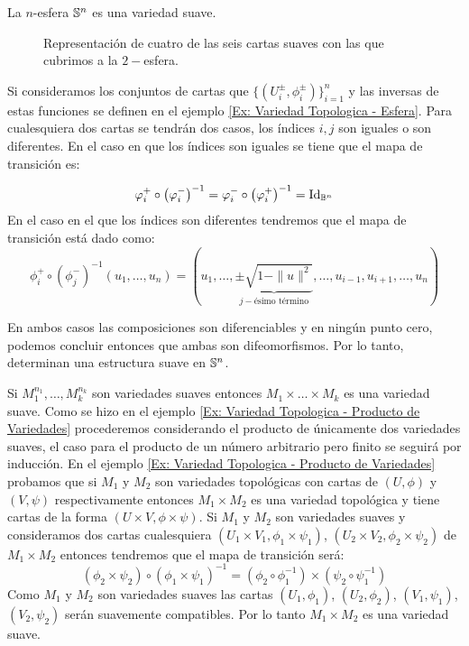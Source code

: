 \begin{example}[$n-$Esfera]
	La $n$-esfera $\S^n$ es una variedad suave.

	\begin{figure}[h]
		\begin{center}
			
			\caption{Representación de cuatro de las seis cartas suaves con las que cubrimos a la $2-$esfera.}
		\end{center}
	\end{figure}

	Si consideramos los conjuntos de cartas que $\{(U_i^{\pm}, \phi_{i}^{\pm})\}_{i=1}^{n}$ y las inversas de estas funciones se definen en el ejemplo \ref{Ex: Variedad Topologica - Esfera}. Para cualesquiera dos cartas se tendrán dos casos, los índices $i,j$ son iguales o son diferentes. En el caso en que los índices son iguales se tiene que el mapa de transición es:

	\[ \phi_i^{+} \circ \left(\phi_{i}^{-}\right)^{-1} = \phi_i^{-} \circ \left(\phi_{i}^{+}\right)^{-1} = \id_{\B^n} \]
	En el caso en el que los índices son diferentes tendremos que el mapa de transición está dado como:
	\[ \phi_i^{+} \circ \left(\phi_{j}^{-}\right)^{-1}(u_1, \dots, u_n) = \left(u_1, \dots, \underbrace{\pm \sqrt{1 - \|u\|^2}}_{j-\text{ésimo término}},\dots, u_{i-1}, u_{i+1}, \dots, u_{n} \right) \]

	En ambos casos las composiciones son diferenciables y en ningún punto cero, podemos concluir entonces que ambas son difeomorfismos. Por lo tanto, determinan una estructura suave en $\S^n$.
\end{example}

\begin{example}\label{Ex: Variedad Suave - Producto de Variedades Suaves}
	Si $M_1^{n_1},\dots,M_k^{n_k}$ son variedades suaves entonces $M_1 \times \dots \times M_k$ es una variedad suave. Como se hizo en el ejemplo \ref{Ex: Variedad Topologica - Producto de Variedades} procederemos considerando el producto de únicamente dos variedades suaves, el caso para el producto de un número arbitrario pero finito se seguirá por inducción.
	En el ejemplo \ref{Ex: Variedad Topologica - Producto de Variedades} probamos que si $M_1$ y $M_2$ son variedades topológicas con cartas de $(U,\phi)$ y $(V,\psi)$ respectivamente entonces $M_1 \times M_2$ es una variedad topológica y tiene cartas de la forma $(U \times V,\phi \times \psi)$. Si $M_1$ y $M_2$ son variedades suaves y consideramos dos cartas cualesquiera $(U_1 \times V_1, \phi_1 \times \psi_1)$, $(U_2 \times V_2, \phi_2 \times \psi_2)$ de $M_1 \times M_2$ entonces tendremos que el mapa de transición será:
	\[
		(\phi_2 \times \psi_2) \circ (\phi_1 \times \psi_1)^{-1} = (\phi_2 \circ \phi_1^{-1}) \times (\psi_2 \circ \psi_1^{-1})
	\]
	Como $M_1$ y $M_2$ son variedades suaves las cartas $(U_1,\phi_1)$, $(U_2,\phi_2)$, $(V_1,\psi_1)$, $(V_2,\psi_2)$ serán suavemente compatibles. Por lo tanto $M_1 \times M_2$ es una variedad suave.
\end{example}

